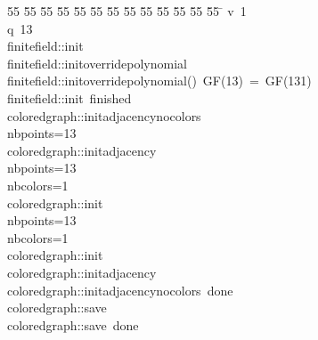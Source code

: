 %
%
\begin{tabbing}
55 \= 55 \= 55 \= 55 \= 55 \= 55 \= 55 \= 55 \= 55 \= 55 \= 55 \= 55 \= 55 \= \kill
{}v\ 1\\[0pt]
q\ 13\\[0pt]
finitefield::init\\[0pt]
finitefield::initoverridepolynomial\\[0pt]
finitefield::initoverridepolynomial()\ GF(13)\ =\ GF(131)\\[0pt]
finitefield::init\ finished\\[0pt]
coloredgraph::initadjacencynocolors\\[0pt]
nbpoints=13\\[0pt]
coloredgraph::initadjacency\\[0pt]
nbpoints=13\\[0pt]
nbcolors=1\\[0pt]
coloredgraph::init\\[0pt]
nbpoints=13\\[0pt]
nbcolors=1\\[0pt]
coloredgraph::init\\[0pt]
coloredgraph::initadjacency\\[0pt]
coloredgraph::initadjacencynocolors\ done\\[0pt]
coloredgraph::save\\[0pt]
coloredgraph::save\ done\\[0pt]
\end{tabbing}
